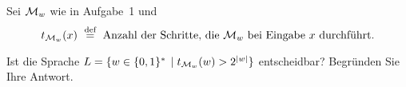 \begin{exercise}
Sei $\mathcal{M}_w$ wie in Aufgabe~1 und 
\[
  t_{\mathcal{M}_w} (x)
  \ \stackrel{\text{def}}{=}\
  \mbox{Anzahl der Schritte, die $\mathcal{M}_w$ bei
        Eingabe $x$ durchf\"uhrt.}
\]

Ist die Sprache $L = \{ w \in \{0,1\}^* \, \mid t_{\mathcal{M}_w}(w) > 2^{|w|} \}$ entscheidbar?
Begr\"unden Sie Ihre Antwort.
\end{exercise}
